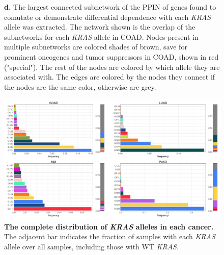 \documentclass[english, 12pt, letterpaper]{article}
\newcommand{\beginsupplement}{%
        \setcounter{table}{0}
        \renewcommand{\thetable}{\arabic{table}}%
        \setcounter{figure}{0}
        \renewcommand{\thefigure}{\arabic{figure}}%
     }
\newcommand{\KRAS}{\emph{KRAS}}
\begin{document}
\begin{figure}
{    \textbf{d.} The largest connected subnetwork of the PPIN of genes found to comutate or demonstrate differential dependence with each \KRAS{} allele was extracted. The network shown is the overlap of the subnetworks for each \KRAS{} allele in COAD. Nodes present in multiple subnetworks are colored shades of brown, save for prominent oncogenes and tumor suppressors in COAD, shown in red ("special"). The rest of the nodes are colored by which allele they are associated with. The edges are colored by the nodes they connect if the nodes are the same color, otherwise are grey.
}
\label{fig:results_integration_main}
\end{figure}



\beginsupplement



\begin{figure}[p]
\centering
\includegraphics[width=\textwidth]{figures/SuppFigure_01.jpeg}
\caption{
    \textbf{The complete distribution of \KRAS{} alleles in each cancer.} The adjacent bar indicates the fraction of samples with each \KRAS{} allele over all samples, including those with WT \KRAS{}.
}
\label{sfig:expanded-kras-allele-distribution}
\end{figure}
\end{document}
